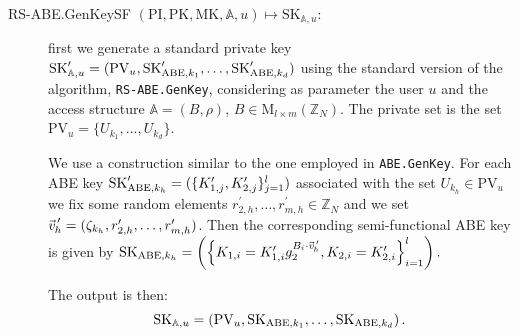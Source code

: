 \documentclass[a4paper,10pt]{article}
\newcommand{\Z}{\mathbb{Z}}
\newcommand{\varRow}{l}
\newcommand{\varColumn}{m}
\newcommand{\pvec}[2][]{{\hspace{-0.05em}\vec{\hspace{0.05em}#2}\mkern2mu\vphantom{#2}}^\prime_{\hspace{-0.18em}#1}}
\newcommand{\matrixset}[3]{\text{M}_{#1\times #2}(#3)}
\newcommand{\mapssingleoutput}[2]{$ \left( #1 \right) \mapsto #2 $}
\newcommand{\algorithm}[2]{\texttt{#1.#2}}
\newcommand{\algorithmdefsingleoutput}[4]{\item[#1.#2 \mapssingleoutput{#3}{#4}:] }
\begin{document}
	\begin{description}
	
\algorithmdefsingleoutput{RS-ABE}{GenKeySF}{\mathrm{PI},\mathrm{PK},\mathrm{MK},\mathbb{A},u}{\mathrm{SK}_{\mathbb{A},u}} first we generate a standard private key $\mathrm{SK}^{\prime}_{\mathbb{A},u}=( \mathrm{PV}_u, \mathrm{SK}^{\prime}_{\textnormal{ABE},k_1}, \ldots, \mathrm{SK}^{\prime}_{\textnormal{ABE},k_d} )$ using the standard version of the algorithm, \algorithm{RS-ABE}{GenKey}, considering as parameter the user $u$ and the access structure $\mathbb{A}=(B,\rho)$, $B\in\matrixset{\varRow}{\varColumn}{\Z_N}$. The private set is the set $\mathrm{PV}_u = \{U_{k_1},\ldots,U_{k_d}\}$.
	
	We use a construction similar to the one employed in \algorithm{ABE}{GenKey}. For each ABE key $\mathrm{SK}^\prime_{\textnormal{ABE},k_h}=(\{K^\prime_{1,j},K^\prime_{2,j}\}_{j=1}^{\varRow})$ associated with the set $U_{k_h}\in \mathrm{PV}_u$ we fix some random elements $r^\prime_{2,h},\ldots,r^\prime_{\varColumn,h}\in \Z_N$ and we set $\pvec[h]{v}=(\zeta_{k_h},r^\prime_{2,h},\ldots,r^\prime_{\varColumn,h})$. 
	Then the corresponding semi-functional ABE key is given by \linebreak  $
	\mathrm{SK}_{\textnormal{ABE},k_h}=
	\left(\left\{
	K_{1,i}=K^\prime_{1,i}g_2^{B_i\cdot \pvec[h]{v}},
	K_{2,i}=K^\prime_{2,i}\right
	\}_{i=1}^{\varRow}\right).
	$
	
	The output is then:
	\[
		\mathrm{SK}_{\mathbb{A},u}=\left( \mathrm{PV}_u, \mathrm{SK}_{\textnormal{ABE},k_1}, \ldots, \mathrm{SK}_{\textnormal{ABE},k_d} \right).
	\]
	
\begin{comment}


	\algorithmdefsingleoutput{RS-ABE}{UpdateKeySF}{\mathrm{PI},\mathrm{PK},\mathrm{MK},T,R}{\mathrm{TK}_{T,R}} the first step is to generate a standard time-update key $\mathrm{TK}^\prime_{T,R}=\left( \mathrm{CV}_R, \mathrm{SK}^\prime_{\textnormal{SUE},1}, \ldots, \mathrm{SK}^\prime_{\textnormal{SUE},m} \right)$ using the standard \algorithm{RS-ABE}{UpdateKey}, associating it to the time $T$ and the set of revoked users $R$. The covering set is the set $\mathrm{CV}_R = \{U_{i_1},\ldots,U_{i_m}\}$.
	
	The final result is very similar to the output of \algorithm{SUE}{GenKey}. For each SUE key $\mathrm{SK}^\prime_{\textnormal{SUE},h}=(K^\prime_0,K^\prime_1,\{K^\prime_{2,j}\}_{j=1}^{n})$ associated with the set $U_{i_h}\in \mathrm{CV}_{R}$ the corresponding semi-functional SUE keys is given by $
	\mathrm{SK}_{\textnormal{SUE},h}=
	\left(
	K_0=K^\prime_0 g_2 ^{\eta_{i_h}},
	K_{1}=K^\prime_{1},
	\left\{
	K_{2,i}=K^\prime_{2,i}\right
	\}_{i=1}^{k}
	\right).$
	

\end{comment}
\end{description}
\end{document}
